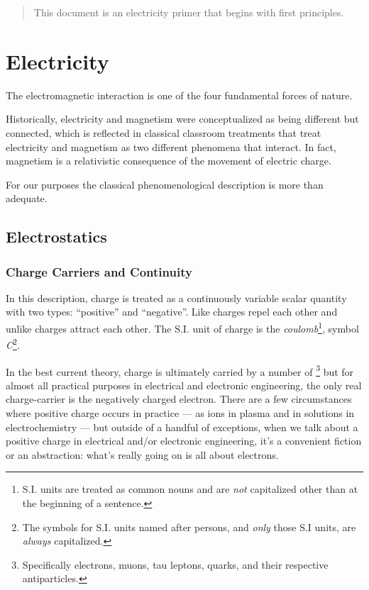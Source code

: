 \begin{abstract}
This document is an electricity primer that begins with first principles.
\end{abstract}

\section{Electricity}

The electromagnetic interaction is one of the four fundamental forces
of nature.

Historically, electricity and magnetism were conceptualized as being
different but connected, which is reflected in classical classroom
treatments that treat electricity and magnetism as two different
phenomena that interact. In fact, magnetism is a relativistic
consequence of the movement of electric charge.

For our purposes the classical phenomenological description is more
than adequate.

\subsection{Electrostatics}

\subsubsection{Charge Carriers and Continuity}

In this description, charge is treated as a continuously variable
scalar quantity with two types: ``positive'' and ``negative''. Like
charges repel each other and unlike charges attract each other. The
S.I. unit of charge is the \emph{coulomb}\footnote{S.I. units are
  treated as common nouns and are \emph{not} capitalized other than at
  the beginning of a sentence.}, symbol \emph{C}\footnote{The symbols
  for S.I. units named after persons, and \emph{only} those S.I units,
  are \emph{always} capitalized.}.

In the best current theory, charge is ultimately carried by a number
of \footnote{Specifically electrons, muons,
  tau leptons, quarks, and their respective antiparticles.} but for
almost all practical purposes in electrical and electronic
engineering, the only real charge-carrier is the negatively charged
electron. There are a few circumstances where positive charge occurs
in practice --- as ions in plasma and in solutions in electrochemistry
--- but outside of a handful of exceptions, when we talk about a
positive charge in electrical and/or electronic engineering, it's a
convenient fiction or an abstraction: what's really going on is all
about electrons.

